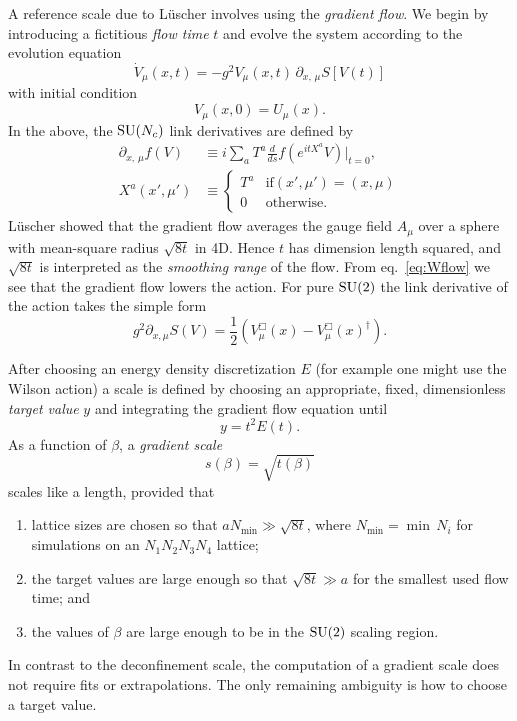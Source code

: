A reference scale due to L\"uscher 
\cite{luscher_properties_2010} involves using 
the {\it gradient flow}. We begin by introducing a
fictitious {\it flow time} $t$ and evolve the system
according to the evolution equation
\begin{equation}\label{eq:Wflow}
  \dot{V}_\mu(x,t)=-g^2V_\mu(x,t)\,\partial_{x,\,\mu}S[V(t)]
\end{equation} 
with initial condition
\begin{equation}
  V_\mu(x,0)=U_\mu(x).
\end{equation}
In the above, the $\operatorname{SU}(N_c)$ link derivatives are defined by
\begin{equation}\begin{aligned}
  \partial_{x,\,\mu}f(V)&\equiv
     i\sum_aT^a\frac{d}{ds}f\left(e^{itX^a}V\right)\Big|_{t=0},\\
    X^a(x',\mu')&\equiv
    \begin{cases}
       T^a & \text{if} (x',\mu')=(x,\mu)\\
       0   & \text{otherwise.}
    \end{cases}
\end{aligned}\end{equation}
L\"uscher showed that the gradient flow averages the gauge field
$A_\mu$ over a sphere with mean-square radius $\sqrt{8t}$ in 4D. Hence
$t$ has dimension length squared, and $\sqrt{8t}$ is interpreted
as the {\it smoothing range} of the flow.
From eq.~\eqref{eq:Wflow} we see that the gradient flow lowers the action. 
For pure $\operatorname{SU}(2)$ the link derivative of the action takes the simple form
\begin{equation}\label{eq:SU2gflow}
  g^2\partial_{x,\mu}S(V)=\frac{1}{2}
          \left(V_\mu^\Box(x)-V_\mu^\Box(x)^\dagger\right).
\end{equation}

After choosing an energy density discretization $E$ (for example
one might use the Wilson action) a scale is defined by choosing an
appropriate, fixed, dimensionless {\it target value} $y$ and integrating
the gradient flow equation until 
\begin{equation}\label{eq:tardef}
  y=t^2 E(t).
\end{equation}
As a function of $\beta$, a {\it gradient scale}
\begin{equation}\label{eq:s}
  s(\beta)=\sqrt{t(\beta)}
\end{equation}
scales like a length, provided that
\begin{enumerate}
  \item lattice sizes are chosen so that $aN_{\min}\gg \sqrt{8t}$,
        where $N_{\min}=\min\,N_i$
        for simulations on an $N_1N_2N_3N_4$ lattice;
  \item the target values are large enough so that $\sqrt{8t}\gg a$ 
        for the smallest used flow time; and
  \item the values of $\beta$ are large enough to be in the
        $\operatorname{SU}(2)$ scaling region.
\end{enumerate}
In contrast to the deconfinement scale, the computation of 
a gradient scale does not require fits or extrapolations.
The only remaining ambiguity is how to choose a target value.

